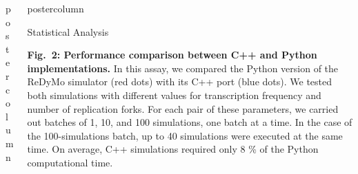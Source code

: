 \documentclass[final,hyperref={pdfpagelabels=false}]{beamer}
\newlength{\columnheight}
\begin{document}
\begin{frame}
\begin{columns}
\begin{column}{.497\textwidth}
\begin{beamercolorbox}[center,wd=\textwidth]{postercolumn}
\begin{minipage}[T]{.95\textwidth}
{\vfill  %

} %
                        
\end{minipage}
\end{beamercolorbox}
\end{column}

\begin{column}{.497\textwidth}
\begin{beamercolorbox}[center,wd=\textwidth]{postercolumn}
\begin{minipage}[T]{.95\textwidth} %
          
\parbox[t][\columnheight]{\textwidth}
{ 
                     

\begin{block}{\protect Statistical Analysis}
\parbox[t][]{0.95\textwidth}
{
\begin{figure}
    \centering
    \label{fig:time_comparison}
\end{figure}
{\bf Fig.~2: Performance comparison between C++ and Python implementations.} In this assay, we compared the Python version of the ReDyMo simulator (red dots) with its C++ port (blue dots). We tested both simulations with different values for transcription frequency and number of replication forks. For each pair of these parameters, we carried out batches of 1, 10, and 100 simulations, one batch at a time. In the case of the 100-simulations batch, up to 40 simulations were executed at the same time. On average, C++ simulations required only 8 \% of the Python computational time.
}
\end{block}                     
                     
}
\end{minipage}
\end{beamercolorbox}
\end{column}
\end{columns}
\end{frame}
\end{document}
